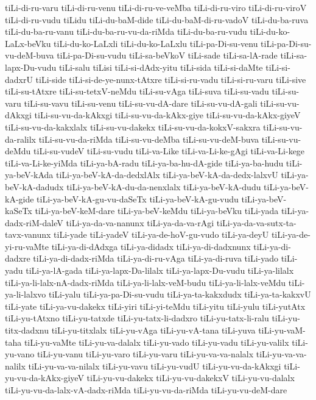 {tiLi-di-ru-varu
tiLi-di-ru-venu
tiLi-di-ru-ve-veMba
tiLi-di-ru-viro
tiLi-di-ru-viroV
tiLi-di-ru-vudu
tiLidu
tiLi-du-baM-dide
tiLi-du-baM-di-ru-vadoV
tiLi-du-ba-ruva
tiLi-du-ba-ru-vanu
tiLi-du-ba-ru-vu-da-riMda
tiLi-du-ba-ru-vudu
tiLi-du-ko-LaLx-beVku
tiLi-du-ko-LaLxli
tiLi-du-ko-LaLxlu
tiLi-pa-Di-su-venu
tiLi-pa-Di-su-vu-deM-buva
tiLi-pa-Di-su-vudu
tiLi-sa-beVkoV
tiLi-sade
tiLi-sa-lA-rade
tiLi-sa-lapx-Du-vudu
tiLi-salu
tiLisi
tiLi-si-dAdx-yitu
tiLi-sida
tiLi-si-daMte
tiLi-si-dadxrU
tiLi-side
tiLi-si-de-ye-nunx-tAtxre
tiLi-si-ru-vadu
tiLi-si-ru-varu
tiLi-sive
tiLi-su-tAtxre
tiLi-su-tetxV-neMdu
tiLi-su-vAga
tiLi-suva
tiLi-su-vadu
tiLi-su-varu
tiLi-su-vavu
tiLi-su-venu
tiLi-su-vu-dA-dare
tiLi-su-vu-dA-gali
tiLi-su-vu-dAkxgi
tiLi-su-vu-da-kAkxgi
tiLi-su-vu-da-kAkx-giye
tiLi-su-vu-da-kAkx-giyeV
tiLi-su-vu-da-kakxlalx
tiLi-su-vu-dakekx
tiLi-su-vu-da-kokxV-sakxra
tiLi-su-vu-da-ralilx
tiLi-su-vu-da-riMda
tiLi-su-vu-deMba
tiLi-su-vu-deM-buva
tiLi-su-vu-deMdu
tiLi-su-vudeV
tiLi-su-vudu
tiLi-va-Like
tiLi-va-Li-ke-gAgi
tiLi-va-Li-kege
tiLi-va-Li-ke-yiMda
tiLi-ya-bA-radu
tiLi-ya-ba-hu-dA-gide
tiLi-ya-ba-hudu
tiLi-ya-beV-kAda
tiLi-ya-beV-kA-da-dedxlAlx
tiLi-ya-beV-kA-da-dedx-lalxvU
tiLi-ya-beV-kA-dadudx
tiLi-ya-beV-kA-du-da-nenxlalx
tiLi-ya-beV-kA-dudu
tiLi-ya-beV-kA-gide
tiLi-ya-beV-kA-gu-vu-daSeTx
tiLi-ya-beV-kA-gu-vudu
tiLi-ya-beV-kaSeTx
tiLi-ya-beV-keM-dare
tiLi-ya-beV-keMdu
tiLi-ya-beVku
tiLi-yada
tiLi-ya-dadx-riM-daleV
tiLi-ya-da-va-nanunx
tiLi-ya-da-va-rAgi
tiLi-ya-da-va-sutx-ta-tavx-vanunx
tiLi-yade
tiLi-yadeV
tiLi-ya-de-hoV-gu-vudo
tiLi-ya-deyU
tiLi-ya-de-yi-ru-vaMte
tiLi-ya-di-dAdxga
tiLi-ya-didadx
tiLi-ya-di-dadxnunx
tiLi-ya-di-dadxre
tiLi-ya-di-dadx-riMda
tiLi-ya-di-ru-vAga
tiLi-ya-di-ruva
tiLi-yado
tiLi-yadu
tiLi-ya-lA-gada
tiLi-ya-lapx-Da-lilalx
tiLi-ya-lapx-Du-vudu
tiLi-ya-lilalx
tiLi-ya-li-lalx-nA-dadx-riMda
tiLi-ya-li-lalx-veM-budu
tiLi-ya-li-lalx-veMdu
tiLi-ya-li-lalxvo
tiLi-yalu
tiLi-ya-pa-Di-su-vudu
tiLi-ya-ta-kakxdudx
tiLi-ya-ta-kakxvU
tiLi-yate
tiLi-ya-vu-dakekx
tiLi-yiri
tiLi-yi-teMdu
tiLi-yitu
tiLi-yulu
tiLi-yutAtx
tiLi-yu-tAtxno
tiLi-yu-tatxde
tiLi-yu-tatx-li-dadxro
tiLi-yu-tatx-li-ralu
tiLi-yu-titx-dadxnu
tiLi-yu-titxlalx
tiLi-yu-vAga
tiLi-yu-vA-tana
tiLi-yuva
tiLi-yu-vaM-taha
tiLi-yu-vaMte
tiLi-yu-va-dalalx
tiLi-yu-vado
tiLi-yu-vadu
tiLi-yu-valilx
tiLi-yu-vano
tiLi-yu-vanu
tiLi-yu-varo
tiLi-yu-varu
tiLi-yu-va-va-nalalx
tiLi-yu-va-va-nalilx
tiLi-yu-va-va-nilalx
tiLi-yu-vavu
tiLi-yu-vudU
tiLi-yu-vu-da-kAkxgi
tiLi-yu-vu-da-kAkx-giyeV
tiLi-yu-vu-dakekx
tiLi-yu-vu-dakekxV
tiLi-yu-vu-dalalx
tiLi-yu-vu-da-lalx-vA-dadx-riMda
tiLi-yu-vu-da-riMda
tiLi-yu-vu-deM-dare
}
